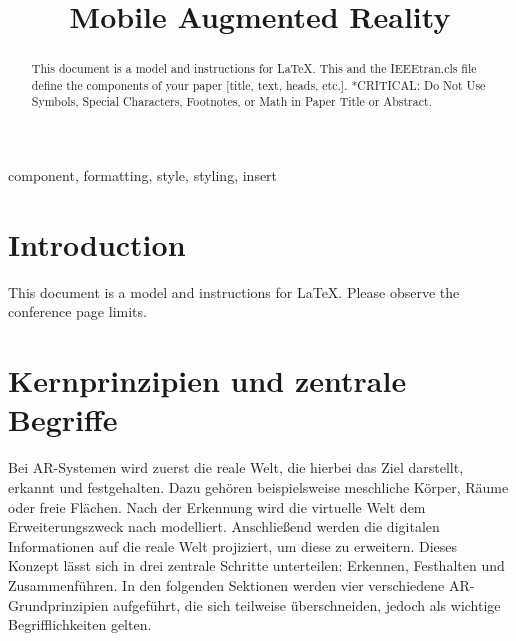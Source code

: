 \documentclass[conference]{IEEEtran}
\begin{document}
\title{Mobile Augmented Reality\\
}

\author{
}

\maketitle

\begin{abstract}
This document is a model and instructions for \LaTeX.
This and the IEEEtran.cls file define the components of your paper [title, text, heads, etc.]. *CRITICAL: Do Not Use Symbols, Special Characters, Footnotes, 
or Math in Paper Title or Abstract.
\end{abstract}

\begin{IEEEkeywords}
component, formatting, style, styling, insert
\end{IEEEkeywords}

\section{Introduction}
This document is a model and instructions for \LaTeX.
Please observe the conference page limits. 



\section{Kernprinzipien und zentrale Begriffe}

Bei AR-Systemen wird zuerst die reale Welt, die hierbei das Ziel darstellt, erkannt und festgehalten. Dazu gehören beispielsweise meschliche Körper, Räume oder freie Flächen. Nach der Erkennung wird die virtuelle Welt dem Erweiterungszweck nach modelliert. Anschließend werden die digitalen Informationen auf die reale Welt projiziert, um diese zu erweitern. Dieses Konzept lässt sich in drei zentrale Schritte unterteilen: Erkennen, Festhalten und Zusammenführen. In den folgenden Sektionen werden vier verschiedene AR-Grundprinzipien aufgeführt, die sich teilweise überschneiden, jedoch als wichtige Begrifflichkeiten gelten.\autocite{amin2015comparative}
\end{document}
